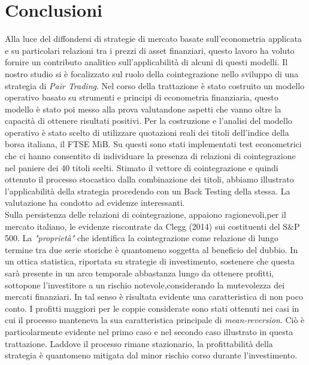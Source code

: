 \documentclass[]{article}
\begin{document}
\break

\section*{Conclusioni}


Alla luce del diffondersi di strategie di mercato basate sull’econometria applicata e su particolari relazioni tra i prezzi di asset finanziari, questo lavoro ha voluto fornire un contributo analitico sull'applicabilità di alcuni di questi modelli. Il nostro studio si è focalizzato sul ruolo della cointegrazione nello sviluppo di una strategia di \textit{Pair Trading}.
Nel corso della trattazione è stato costruito un modello operativo basato su strumenti e principi di econometria finanziaria, questo modello è stato poi messo alla prova valutandone aspetti che vanno oltre la capacità di ottenere risultati positivi.
Per la costruzione e l'analisi del modello operativo è stato scelto di utilizzare quotazioni reali dei titoli dell'indice della borsa italiana, il  FTSE MiB.
Su questi sono stati implementati test econometrici che ci hanno consentito di individuare la presenza di relazioni di cointegrazione nel paniere dei 40 titoli scelti.
Stimato il vettore di cointegrazione e quindi ottenuto il processo stocastico dalla combinazione dei titoli, abbiamo illustrato l'applicabilità della strategia procedendo con un Back Testing della stessa. La valutazione ha condotto ad evidenze interessanti. 
\\
Sulla persistenza delle relazioni di cointegrazione, appaiono ragionevoli,per il mercato italiano, le evidenze riscontrate da Clegg (2014) sui costituenti del S\&P 500.
La \textit{"proprietà"} che identifica la cointegrazione come relazione di lungo termine tra due serie storiche è quantomeno soggetta al beneficio del dubbio.
In un ottica statistica, riportata su strategie di investimento, sostenere che questa sarà presente in un arco temporale abbastanza lungo da ottenere profitti, sottopone l'investitore a un rischio notevole,considerando la mutevolezza dei mercati finanziari.
In tal senso è risultata evidente una caratteristica di non poco conto.
I profitti maggiori per le coppie considerate sono stati ottenuti nei casi in cui il processo manteneva la sua caratteristica principale di \textit{mean-reversion}. Ciò è particolarmente evidente nel primo caso e nel secondo caso illustrato in questa trattazione.
Laddove il processo rimane stazionario, la profittabilità della strategia è quantomeno mitigata dal minor rischio corso durante l'investimento.
\end{document}
